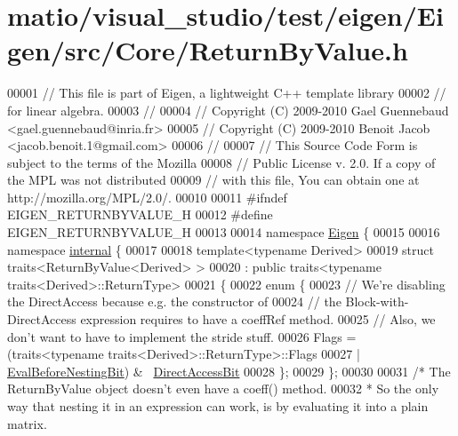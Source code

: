\hypertarget{matio_2visual__studio_2test_2eigen_2_eigen_2src_2_core_2_return_by_value_8h_source}{}\section{matio/visual\+\_\+studio/test/eigen/\+Eigen/src/\+Core/\+Return\+By\+Value.h}
\label{matio_2visual__studio_2test_2eigen_2_eigen_2src_2_core_2_return_by_value_8h_source}

\begin{DoxyCode}
00001 \textcolor{comment}{// This file is part of Eigen, a lightweight C++ template library}
00002 \textcolor{comment}{// for linear algebra.}
00003 \textcolor{comment}{//}
00004 \textcolor{comment}{// Copyright (C) 2009-2010 Gael Guennebaud <gael.guennebaud@inria.fr>}
00005 \textcolor{comment}{// Copyright (C) 2009-2010 Benoit Jacob <jacob.benoit.1@gmail.com>}
00006 \textcolor{comment}{//}
00007 \textcolor{comment}{// This Source Code Form is subject to the terms of the Mozilla}
00008 \textcolor{comment}{// Public License v. 2.0. If a copy of the MPL was not distributed}
00009 \textcolor{comment}{// with this file, You can obtain one at http://mozilla.org/MPL/2.0/.}
00010 
00011 \textcolor{preprocessor}{#ifndef EIGEN\_RETURNBYVALUE\_H}
00012 \textcolor{preprocessor}{#define EIGEN\_RETURNBYVALUE\_H}
00013 
00014 \textcolor{keyword}{namespace }\hyperlink{namespace_eigen}{Eigen} \{
00015 
00016 \textcolor{keyword}{namespace }\hyperlink{namespaceinternal}{internal} \{
00017 
00018 \textcolor{keyword}{template}<\textcolor{keyword}{typename} Derived>
00019 \textcolor{keyword}{struct }traits<ReturnByValue<Derived> >
00020   : \textcolor{keyword}{public} traits<typename traits<Derived>::ReturnType>
00021 \{
00022   \textcolor{keyword}{enum} \{
00023     \textcolor{comment}{// We're disabling the DirectAccess because e.g. the constructor of}
00024     \textcolor{comment}{// the Block-with-DirectAccess expression requires to have a coeffRef method.}
00025     \textcolor{comment}{// Also, we don't want to have to implement the stride stuff.}
00026     Flags = (traits<typename traits<Derived>::ReturnType>::Flags
00027              | \hyperlink{group__flags_gaa34e83bae46a8eeae4e69ebe3aaecbed}{EvalBeforeNestingBit}) & ~\hyperlink{group__flags_gabf1e9d0516a933445a4c307ad8f14915}{DirectAccessBit}
00028   \};
00029 \};
00030 
00031 \textcolor{comment}{/* The ReturnByValue object doesn't even have a coeff() method.}
00032 \textcolor{comment}{ * So the only way that nesting it in an expression can work, is by evaluating it into a plain matrix.}

\end{DoxyCode}
